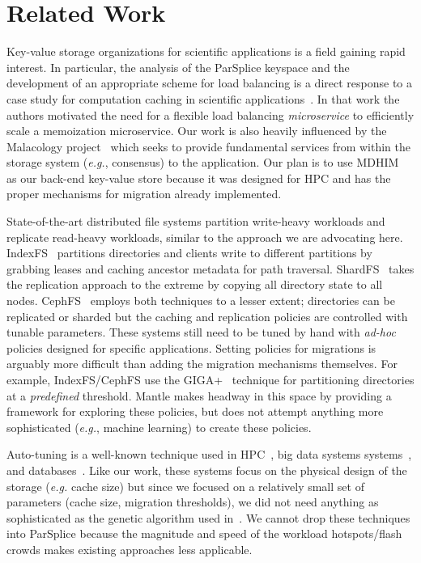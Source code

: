 \section{Related Work}

Key-value storage organizations for scientific applications is a field gaining
rapid interest. In particular, the analysis of the ParSplice keyspace and the
development of an appropriate scheme for load balancing is a direct response to
a case study for computation caching in scientific
applications~\cite{jenkins:ipdsw17-mochi}. In that work the authors motivated
the need for a flexible load balancing \emph{microservice} to efficiently scale
a memoization microservice. Our work is also heavily influenced by the
Malacology project~\cite{sevilla:eurosys17-malacology} which seeks to provide
fundamental services from within the storage system ({\it e.g.}, consensus) to
the application.  Our plan is to use
MDHIM~\cite{greenberg:hotstorage2015-mdhim} as our back-end key-value store
because it was designed for HPC and has the proper mechanisms for migration
already implemented.  

State-of-the-art distributed file systems partition write-heavy workloads and
replicate read-heavy workloads, similar to the approach we are advocating here.
IndexFS~\cite{ren:sc2014-indexfs} partitions directories and clients write to
different partitions by grabbing leases and caching ancestor metadata for path
traversal. ShardFS~\cite{xiao:socc15-shardfs} takes the replication approach to
the extreme by copying all directory state to all nodes.
CephFS~\cite{weil:sc2004-dyn-metadata, weil:osdi2006-ceph} employs both
techniques to a lesser extent; directories can be replicated or sharded but the
caching and replication policies are controlled with tunable parameters.  These
systems still need to be tuned by hand with {\it ad-hoc} policies designed for
specific applications.  Setting policies for migrations is arguably more
difficult than adding the migration mechanisms themselves.  For example,
IndexFS/CephFS use the GIGA+~\cite{patil:fast2011-giga} technique for
partitioning directories at a \emph{predefined} threshold. Mantle makes headway
in this space by providing a framework for exploring these policies, but does
not attempt anything more sophisticated ({\it e.g.}, machine learning) to
create these policies. 

Auto-tuning is a well-known technique used in
HPC~\cite{behzad:sc2013-autotuning, behzad:techreport2014-io-autotuning}, big
data systems systems~\cite{herodotou_starfish_2011}, and
databases~\cite{schnaitter_index_2009}.  Like our work, these systems focus on
the physical design of the storage ({\it e.g.} cache size) but since we focused
on a relatively small set of parameters (cache size, migration thresholds), we
did not need anything as sophisticated as the genetic algorithm used
in~\cite{behzad:sc2013-autotuning}.  We cannot drop these techniques into
ParSplice because the magnitude and speed of the workload hotspots/flash crowds
makes existing approaches less applicable. 

